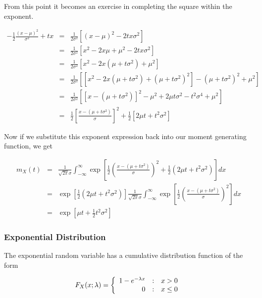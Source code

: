 \documentclass[]{article}
\begin{document}
From this point it becomes an exercise in completing the square within
the exponent.

\begin{eqnarray*}
-\frac{1}{2} \frac{(x-\mu)^2}{\sigma^2} + tx & = & \frac{1}{2\sigma^2} \left[
      (x-\mu)^2 - 2tx\sigma^2 \right] \\
   &= &\frac{1}{2\sigma^2} \left[ x^2 - 2x\mu + \mu^2 - 2tx\sigma^2 \right] \\
   &= &\frac{1}{2\sigma^2} \left[ x^2 - 2x(\mu + t\sigma^2) + \mu^2 \right] \\
   &= &\frac{1}{2\sigma^2} \left[ [ x^2 - 2x(\mu + t\sigma^2) + (\mu + t\sigma^2)^2 ]
       - (\mu + t\sigma^2)^2 + \mu^2 \right] \\
   &= &\frac{1}{2\sigma^2} \left[ [x - (\mu + t\sigma^2)]^2
       - \mu^2 + 2\mu t \sigma^2 - t^2 \sigma^4 + \mu^2 \right] \\
   &= &\frac{1}{2} \left[ \frac{x - (\mu + t\sigma^2)}{\sigma} \right]^2
      +\frac{1}{2} \left[ 2\mu t + t^2 \sigma^2 \right]
\end{eqnarray*}

Now if we substitute this exponent expression back into our moment
generating function, we get

\begin{eqnarray}
m_X(t) &= &\frac{1}{\sqrt{2\pi} \sigma} \int_{-\infty}^{\infty} \exp \left[
   \frac{1}{2} \left( \frac{x - (\mu + t\sigma^2)}{\sigma} \right)^2
      +\frac{1}{2} ( 2\mu t + t^2 \sigma^2) \right] dx  \nonumber \\
  &= &\exp \left[ \frac{1}{2} ( 2\mu t + t^2 \sigma^2) \right] \frac{1}{\sqrt{2\pi} \sigma} 
   \int_{-\infty}^{\infty} \exp \left[ \frac{1}{2} 
   \left( \frac{x - (\mu + t\sigma^2)}{\sigma} \right)^2 \right] dx \nonumber \\
  &= & \exp \left[\mu t + \frac{1}{2}t^2 \sigma^2 \right] \label{norm_mgf}
\end{eqnarray}

\subsubsection{Exponential Distribution}

The exponential random variable has a cumulative distribution
function of the form

\begin{equation} \label{exp_cdf}
F_X(x; \lambda) = \left\{ \begin{array}{r@{\quad:\quad}l}
   1 - e^{-\lambda x} & x > 0 \\
   0 & x \le 0
 \end{array} \right.
\end{equation}
\end{document}
